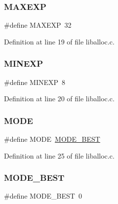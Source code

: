 \subsubsection{\texorpdfstring{M\+A\+X\+E\+XP}{MAXEXP}}
{\footnotesize\ttfamily \#define M\+A\+X\+E\+XP~32}



Definition at line 19 of file liballoc.\+c.

\mbox{\label{a00023_ae7249b0af4d1bfe02a4c7bdbf810bd8c_ae7249b0af4d1bfe02a4c7bdbf810bd8c}} 
\subsubsection{\texorpdfstring{M\+I\+N\+E\+XP}{MINEXP}}
{\footnotesize\ttfamily \#define M\+I\+N\+E\+XP~8}



Definition at line 20 of file liballoc.\+c.

\mbox{\label{a00023_ab8c52c1b4c021ed3e6b6b677bd2ac019_ab8c52c1b4c021ed3e6b6b677bd2ac019}} 
\subsubsection{\texorpdfstring{M\+O\+DE}{MODE}}
{\footnotesize\ttfamily \#define M\+O\+DE~\hyperlink{a00023_a881288ad0450ab9858bf01b030e755b0_a881288ad0450ab9858bf01b030e755b0}{M\+O\+D\+E\+\_\+\+B\+E\+ST}}



Definition at line 25 of file liballoc.\+c.

\mbox{\label{a00023_a881288ad0450ab9858bf01b030e755b0_a881288ad0450ab9858bf01b030e755b0}} 
\subsubsection{\texorpdfstring{M\+O\+D\+E\+\_\+\+B\+E\+ST}{MODE\_BEST}}
{\footnotesize\ttfamily \#define M\+O\+D\+E\+\_\+\+B\+E\+ST~0}




